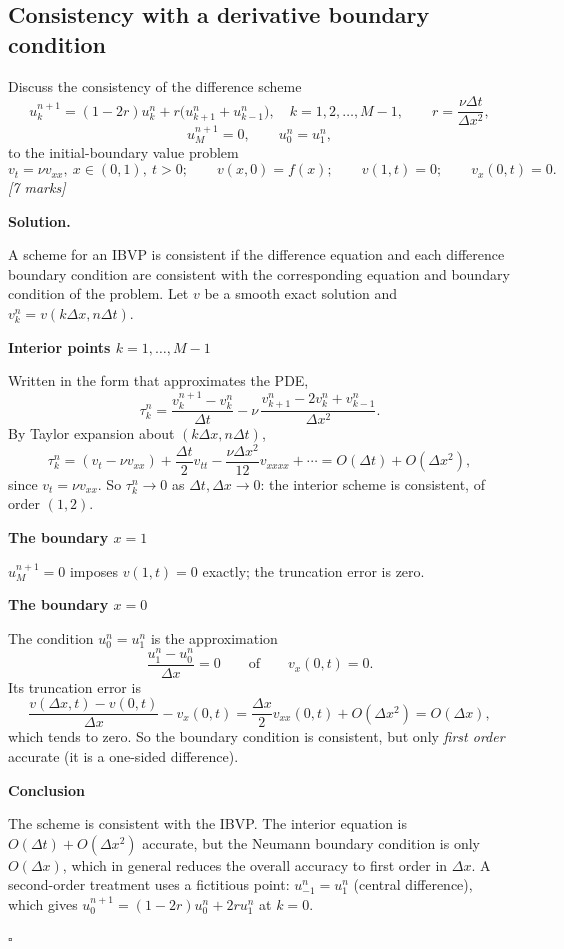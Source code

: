 \documentclass[11pt,a4paper]{article}
\newenvironment{solution}
  {\par\noindent\textbf{Solution.}\par\nobreak}
  {\par\hfill\(\square\)\par}
\newcommand{\step}[1]{\par\addvspace{0.5em}\noindent\textbf{#1}\par\nobreak}
\newcommand{\mk}[1]{\hfill\textit{[#1 marks]}}
\begin{document}
\subsection{Consistency with a derivative boundary condition}

\begin{qbox}
Discuss the consistency of the difference scheme
\[
  u_k^{n+1}=(1-2r)u_k^n+r\bigl(u_{k+1}^n+u_{k-1}^n\bigr),\quad
  k=1,2,\dots,M-1,\qquad r=\frac{\nu\Delta t}{\Delta x^2},
\]
\[
  u_M^{n+1}=0,\qquad u_0^n=u_1^n,
\]
to the initial-boundary value problem
\[
  v_t=\nu v_{xx},\ x\in(0,1),\ t>0;\qquad
  v(x,0)=f(x);\qquad v(1,t)=0;\qquad v_x(0,t)=0 .
\]\mk{7}
\end{qbox}

\begin{solution}
A scheme for an IBVP is consistent if the difference equation and each
difference boundary condition are consistent with the corresponding
equation and boundary condition of the problem.  Let \(v\) be a smooth
exact solution and \(v_k^n=v(k\Delta x,n\Delta t)\).

\step{Interior points \(k=1,\dots,M-1\)}
Written in the form that approximates the PDE,
\[
  \tau_k^n=\frac{v_k^{n+1}-v_k^n}{\Delta t}
  -\nu\,\frac{v_{k+1}^n-2v_k^n+v_{k-1}^n}{\Delta x^2}.
\]
By Taylor expansion about \((k\Delta x,n\Delta t)\),
\[
  \tau_k^n=(v_t-\nu v_{xx})+\frac{\Delta t}2v_{tt}
  -\frac{\nu\Delta x^2}{12}v_{xxxx}+\cdots
  =O(\Delta t)+O(\Delta x^2),
\]
since \(v_t=\nu v_{xx}\).  So \(\tau_k^n\to0\) as
\(\Delta t,\Delta x\to0\): the interior scheme is consistent, of order
\((1,2)\).

\step{The boundary \(x=1\)}
\(u_M^{n+1}=0\) imposes \(v(1,t)=0\) exactly; the truncation error is
zero.

\step{The boundary \(x=0\)}
The condition \(u_0^n=u_1^n\) is the approximation
\[
  \frac{u_1^n-u_0^n}{\Delta x}=0\qquad\text{of}\qquad v_x(0,t)=0 .
\]
Its truncation error is
\[
  \frac{v(\Delta x,t)-v(0,t)}{\Delta x}-v_x(0,t)
  =\frac{\Delta x}{2}v_{xx}(0,t)+O(\Delta x^2)=O(\Delta x),
\]
which tends to zero.  So the boundary condition is consistent, but only
\emph{first order} accurate (it is a one-sided difference).

\step{Conclusion}
The scheme is consistent with the IBVP.  The interior equation is
\(O(\Delta t)+O(\Delta x^2)\) accurate, but the Neumann boundary
condition is only \(O(\Delta x)\), which in general reduces the overall
accuracy to first order in \(\Delta x\).  A second-order treatment uses
a fictitious point: \(u_{-1}^n=u_1^n\) (central difference), which gives
\(u_0^{n+1}=(1-2r)u_0^n+2ru_1^n\) at \(k=0\).
\end{solution}
\end{document}
